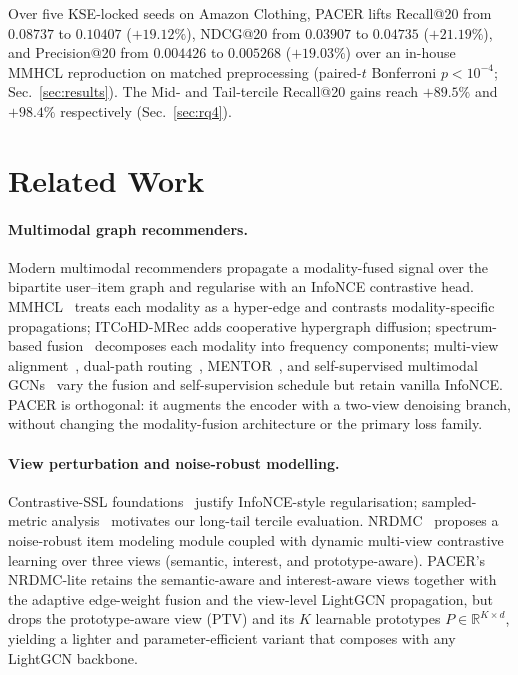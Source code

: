 \documentclass[conference]{IEEEtran}
\begin{document}
Over five KSE-locked seeds on Amazon Clothing, PACER lifts Recall@20
from $0.08737$ to $0.10407$ ($+19.12\%$), NDCG@20 from $0.03907$ to
$0.04735$ ($+21.19\%$), and Precision@20 from $0.004426$ to
$0.005268$ ($+19.03\%$) over an in-house MMHCL reproduction on
matched preprocessing (paired-$t$ Bonferroni $p<10^{-4}$;
Sec.~\ref{sec:results}). The Mid- and Tail-tercile Recall@20 gains
reach $+89.5\%$ and $+98.4\%$ respectively (Sec.~\ref{sec:rq4}).

\section{Related Work}
\label{sec:related}

\paragraph{Multimodal graph recommenders.} Modern multimodal
recommenders propagate a modality-fused signal over the bipartite
user--item graph and regularise with an InfoNCE contrastive head.
MMHCL~\cite{guo2025mmhcl} treats each modality as a hyper-edge and
contrasts modality-specific propagations; ITCoHD-MRec
\cite{hao2026itcohd} adds cooperative hypergraph diffusion;
spectrum-based fusion~\cite{ong2025spectrum,wang2026damps} decomposes
each modality into frequency components; multi-view
alignment~\cite{li2026multiview}, dual-path
routing~\cite{yan2025compensating}, MENTOR~\cite{xu2025mentor}, and
self-supervised multimodal GCNs~\cite{kim2024self} vary the fusion
and self-supervision schedule but retain vanilla InfoNCE.
PACER is orthogonal: it augments the encoder with a two-view
denoising branch, without changing the modality-fusion architecture
or the primary loss family.

\paragraph{View perturbation and noise-robust modelling.}
Contrastive-SSL foundations~\cite{chen2022intent,liu2021self,liu2023self}
justify InfoNCE-style regularisation; sampled-metric
analysis~\cite{krichene2020sampled} motivates our long-tail tercile
evaluation. NRDMC~\cite{gong2026noise} proposes a noise-robust item
modeling module coupled with dynamic multi-view contrastive learning
over three views (semantic, interest, and prototype-aware). PACER's
NRDMC-lite retains the semantic-aware and interest-aware views
together with the adaptive edge-weight fusion and the view-level
LightGCN propagation, but drops the prototype-aware view (PTV) and
its $K$ learnable prototypes $P\in\mathbb{R}^{K\times d}$, yielding a
lighter and parameter-efficient variant that composes with any
LightGCN backbone.
\end{document}
